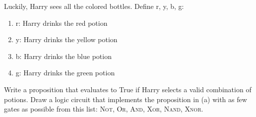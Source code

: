 \documentclass[solution, letterpaper]{cs20exam}
\begin{document}
Luckily, Harry sees all the colored bottles. Define r, y, b, g:
\begin{enumerate}
\item r: Harry drinks the red potion
\item y: Harry drinks the yellow potion
\item b: Harry drinks the blue potion
\item g: Harry drinks the green potion
\end{enumerate}

\subproblem Write a proposition that evaluates to True if Harry selects a valid combination of potions. 
\subproblem Draw a logic circuit that implements the proposition in (a) with as few gates as possible from this list: \textsc{Not}, \textsc{Or}, \textsc{And}, \textsc{Xor}, \textsc{Nand}, \textsc{Xnor}.

\begin{solution}
\end{solution}
\end{document}
